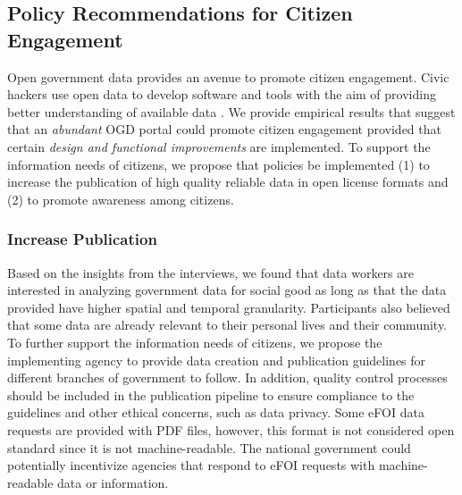 \documentclass{sigchi}
\begin{document}


\subsection{Policy Recommendations for Citizen Engagement}
Open government data provides an avenue to promote citizen engagement. Civic hackers use open data to develop software and tools with the aim of providing better understanding of available data \cite{Choi2017, Puussaar2018, Robinson2016}. We provide empirical results that suggest that an \textit{abundant} OGD portal could promote citizen engagement provided that certain \textit{design and functional improvements} are implemented. To support the information needs of citizens, we propose that policies be implemented (1) to increase the publication of high quality reliable data in open license formats and (2) to promote awareness among citizens. 

\subsubsection{Increase Publication}
Based on the insights from the interviews, we found that data workers are interested in analyzing government data for social good as long as that the data provided have higher spatial and temporal granularity. Participants also believed that some data are already relevant to their personal lives and their community. To further support the information needs of citizens, we propose the implementing agency to provide data creation and publication guidelines for different branches of government to follow. In addition, quality control processes should be included in the publication pipeline to ensure compliance to the guidelines and other ethical concerns, such as data privacy. Some eFOI data requests are provided with PDF files, however, this format is not considered open standard since it is not machine-readable. The national government could potentially incentivize agencies that respond to eFOI requests with machine-readable data or information. 
\end{document}
